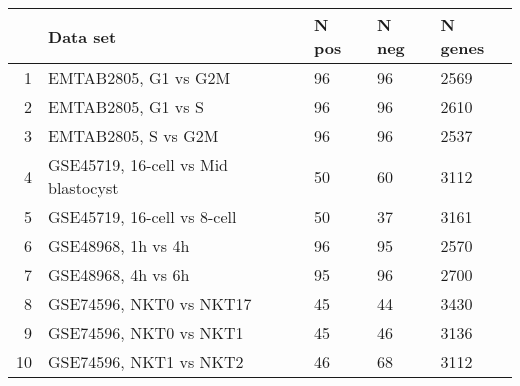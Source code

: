 \begin{table}[ht]
\centering
\begin{tabular}{rllll}
  \hline
 & Data set & N pos & N neg & N genes \\ 
  \hline
1 & EMTAB2805, G1 vs G2M & 96 & 96 & 2569 \\ 
  2 & EMTAB2805, G1 vs S & 96 & 96 & 2610 \\ 
  3 & EMTAB2805, S vs G2M & 96 & 96 & 2537 \\ 
  4 & GSE45719, 16-cell vs Mid blastocyst & 50 & 60 & 3112 \\ 
  5 & GSE45719, 16-cell vs 8-cell & 50 & 37 & 3161 \\ 
  6 & GSE48968, 1h vs 4h & 96 & 95 & 2570 \\ 
  7 & GSE48968, 4h vs 6h & 95 & 96 & 2700 \\ 
  8 & GSE74596, NKT0 vs NKT17 & 45 & 44 & 3430 \\ 
  9 & GSE74596, NKT0 vs NKT1 & 45 & 46 & 3136 \\ 
  10 & GSE74596, NKT1 vs NKT2 & 46 & 68 & 3112 \\ 
   \hline
\end{tabular}
\end{table}
